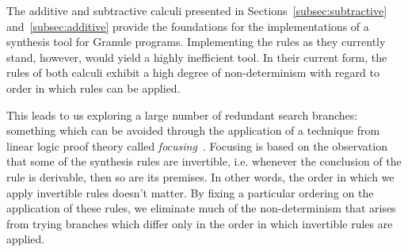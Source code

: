 The additive and subtractive calculi presented in
Sections~\ref{subsec:subtractive} and~\ref{subsec:additive} provide the
foundations for the implementations of a synthesis tool for Granule programs.
Implementing the rules as they currently stand, however, would yield a highly
inefficient tool. In their current form, the rules of both calculi exhibit a
high degree of non-determinism with regard to order in which rules
can be applied. 


This leads to us exploring a large number of redundant search branches: something which can
be avoided through the application of a technique from linear logic proof theory
called \textit{focusing}~\citep{focusing}. Focusing is based on the observation
that some of the synthesis rules are invertible, i.e. whenever the conclusion of
the rule is derivable, then so are its premises. In other words, the order in
which we apply invertible rules doesn't matter. By fixing a particular ordering
on the application of these rules, we eliminate much of the non-determinism that
arises from trying branches which differ only in the order in which invertible
rules are applied. 

